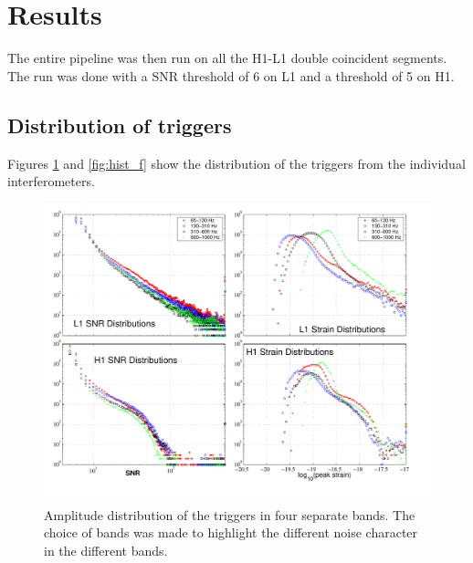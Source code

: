 \section{Results}

The entire pipeline was then run on all the H1-L1 double coincident segments.
The run was done with a SNR threshold of 6 on L1 and a threshold of 5 on H1.


\subsection{Distribution of triggers}

Figures \ref{fig:hist_bands} and \ref{fig:hist_f} show the distribution
of the triggers from the individual interferometers.

\begin{figure}[!h]
\centerline{\includegraphics[angle=0,width=6.5in]{Figures/Chap7/cooter.pdf}}
\caption[Histograms of the Bands]{Amplitude distribution of the triggers in
         four separate bands. The choice of bands was made to highlight the
         different noise character in the different bands.}
\label{fig:hist_bands}
\end{figure}


